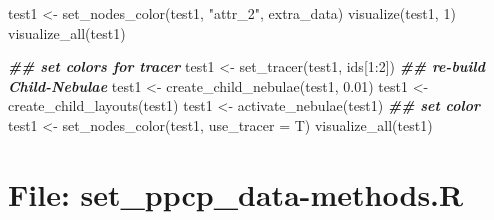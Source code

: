 \documentclass[
]{article}
\newenvironment{Shaded}{\begin{snugshade}}{\end{snugshade}}
\newcommand{\AttributeTok}[1]{\textcolor[rgb]{0.77,0.63,0.00}{#1}}
\newcommand{\DecValTok}[1]{\textcolor[rgb]{0.00,0.00,0.81}{#1}}
\newcommand{\DocumentationTok}[1]{\textcolor[rgb]{0.56,0.35,0.01}{\textbf{\textit{#1}}}}
\newcommand{\FloatTok}[1]{\textcolor[rgb]{0.00,0.00,0.81}{#1}}
\newcommand{\FunctionTok}[1]{\textcolor[rgb]{0.00,0.00,0.00}{#1}}
\newcommand{\NormalTok}[1]{#1}
\newcommand{\OtherTok}[1]{\textcolor[rgb]{0.56,0.35,0.01}{#1}}
\newcommand{\SpecialCharTok}[1]{\textcolor[rgb]{0.00,0.00,0.00}{#1}}
\newcommand{\StringTok}[1]{\textcolor[rgb]{0.31,0.60,0.02}{#1}}
\begin{document}
\begin{Shaded}
\begin{Highlighting}[]
\NormalTok{test1 }\OtherTok{\textless{}{-}} \FunctionTok{set\_nodes\_color}\NormalTok{(test1, }\StringTok{"attr\_2"}\NormalTok{, extra\_data)}
\FunctionTok{visualize}\NormalTok{(test1, }\DecValTok{1}\NormalTok{)}
\FunctionTok{visualize\_all}\NormalTok{(test1)}

\DocumentationTok{\#\# set colors for \textquotesingle{}tracer\textquotesingle{}}
\NormalTok{test1 }\OtherTok{\textless{}{-}} \FunctionTok{set\_tracer}\NormalTok{(test1, ids[}\DecValTok{1}\SpecialCharTok{:}\DecValTok{2}\NormalTok{])}
\DocumentationTok{\#\# re{-}build Child{-}Nebulae}
\NormalTok{test1 }\OtherTok{\textless{}{-}} \FunctionTok{create\_child\_nebulae}\NormalTok{(test1, }\FloatTok{0.01}\NormalTok{)}
\NormalTok{test1 }\OtherTok{\textless{}{-}} \FunctionTok{create\_child\_layouts}\NormalTok{(test1)}
\NormalTok{test1 }\OtherTok{\textless{}{-}} \FunctionTok{activate\_nebulae}\NormalTok{(test1)}
\DocumentationTok{\#\# set color}
\NormalTok{test1 }\OtherTok{\textless{}{-}} \FunctionTok{set\_nodes\_color}\NormalTok{(test1, }\AttributeTok{use\_tracer =}\NormalTok{ T)}
\FunctionTok{visualize\_all}\NormalTok{(test1)}
\end{Highlighting}
\end{Shaded}

\hypertarget{file-set_ppcp_data-methods.r}{%
\section{File: set\_ppcp\_data-methods.R}\label{file-set_ppcp_data-methods.r}}
\end{document}

